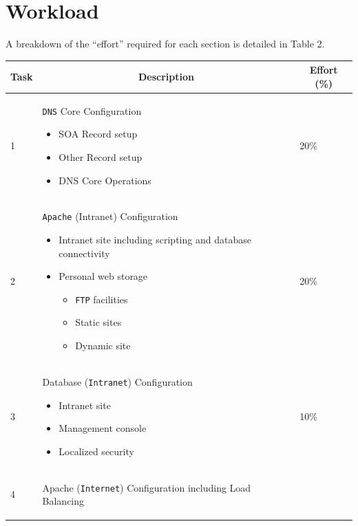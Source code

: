 \documentclass[11pt]{article}
\begin{document}
\section{Workload}
A breakdown of the ``effort'' required for each section is detailed in Table 2.

\begin{table}[ht]\label{workload}
    \begin{tabular}{|p{1cm}|p{14cm}|p{1cm}|} 
      \hline
      \multicolumn{1}{|c|}{Task} & \multicolumn{1}{|c|}{Description} & \multicolumn{1}{|c|}{Effort (\%)}\\ 
      \hline
      1 & \texttt{DNS} Core Configuration 
            \begin{itemize}
                \item SOA Record setup
                \item Other Record setup
                \item DNS Core Operations 
            \end{itemize}
        & 20\%\\
      \hline
      2 & \texttt{Apache} (Intranet) Configuration
            \begin{itemize}
                \item Intranet site including scripting and database connectivity
                \item Personal web storage
                    \begin{itemize}
                        \item \texttt{FTP} facilities
                        \item Static sites
                        \item Dynamic site
                    \end{itemize}
            \end{itemize} 
        & 20\%\\
      \hline
      3 & Database (\texttt{Intranet}) Configuration
            \begin{itemize}
              \item Intranet site
              \item Management console
              \item Localized security    
            \end{itemize}
      & 10\%\\
      \hline
      4 & Apache (\texttt{Internet}) Configuration including Load Balancing
            \begin{itemize}

\end{itemize}
\end{tabular}
\end{table}
\end{document}
